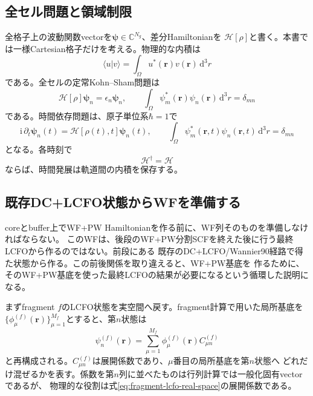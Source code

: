 \documentclass[11pt,a4paper]{article}
\newcommand{\dd}{\mathrm d}
\begin{document}
\subsection{全セル問題と領域制限}
全格子上の波動関数vectorを$\boldsymbol\psi\in\mathbb C^{N_g}$、差分Hamiltonianを
$\mathcal H[\rho]$と書く。本書では一様Cartesian格子だけを考える。物理的な内積は
\begin{equation}
 \langle u|v\rangle=\int_\Omega u^*(\boldsymbol r)v(\boldsymbol r)\,\dd^3r
 \label{eq:continuous-spatial-inner-product}
\end{equation}
である。全セルの定常Kohn--Sham問題は
\begin{equation}
 \mathcal H[\rho]\boldsymbol\psi_n=\epsilon_n\boldsymbol\psi_n,
 \qquad \int_\Omega\psi_m^*(\boldsymbol r)\psi_n(\boldsymbol r)\,\dd^3r=\delta_{mn}
 \label{eq:global-grid}
\end{equation}
である。時間依存問題は、原子単位系$\hbar=1$で
\begin{equation}
 \mathrm i\,\partial_t\boldsymbol\psi_n(t)
 =\mathcal H[\rho(t),t]\boldsymbol\psi_n(t),
 \qquad
 \int_\Omega\psi_m^*(\boldsymbol r,t)\psi_n(\boldsymbol r,t)\,\dd^3r=\delta_{mn}
 \label{eq:global-grid-time-dependent}
\end{equation}
となる。各時刻で
\begin{equation}
 \mathcal H^\dagger=\mathcal H
 \label{eq:global-grid-q-hermiticity}
\end{equation}
ならば、時間発展は軌道間の内積を保存する。

\subsection{既存DC+LCFO状態からWFを準備する}
coreとbuffer上でWF+PW Hamiltonianを作る前に、WF列そのものを準備しなければならない。
このWFは、後段のWF+PW分割SCFを終えた後に行う最終LCFOから作るのではない。前段にある
既存のDC+LCFO/Wannier90経路で得た状態から作る。この前後関係を取り違えると、WF+PW基底を
作るために、そのWF+PW基底を使った最終LCFOの結果が必要になるという循環した説明になる。

まずfragment $f$のLCFO状態を実空間へ戻す。fragment計算で用いた局所基底を
$\{\phi_\mu^{(f)}(\boldsymbol r)\}_{\mu=1}^{M_f}$とすると、第$n$状態は
\begin{equation}
 \psi_n^{(f)}(\boldsymbol r)=\sum_{\mu=1}^{M_f}
 \phi_\mu^{(f)}(\boldsymbol r)C_{\mu n}^{(f)}
 \label{eq:fragment-lcfo-real-space}
\end{equation}
と再構成される。$C_{\mu n}^{(f)}$は展開係数であり、$\mu$番目の局所基底を第$n$状態へ
どれだけ混ぜるかを表す。係数を第$n$列に並べたものは行列計算では一般化固有vectorであるが、
物理的な役割は式\eqref{eq:fragment-lcfo-real-space}の展開係数である。
\end{document}

